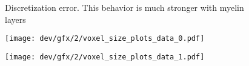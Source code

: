 
% 
\begin{figure}[!t]
\centering
\resizebox{1.0\textwidth}{!}{
\tikzset{external/export=false}
}
\caption[Discretization error]{Discretization error.
This behavior is much stronger with myelin layers}
\label{fig:vectorfield_disc_error}
\end{figure}
% 
\begin{figure}[p]
\centering
\texttt{[image: dev/gfx/2/voxel\_size\_plots\_data\_0.pdf]}
\caption[]{\dummy{}}
\label{fig:voxelsize}
\end{figure}
% 
\begin{figure}[p]
\centering
\texttt{[image: dev/gfx/2/voxel\_size\_plots\_data\_1.pdf]}
\caption[]{\dummy{}}
\label{fig:voxelsize}
\end{figure}
% 
% 
% 

